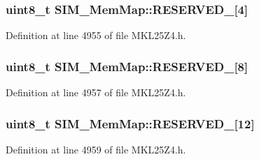 \subsubsection[{\texorpdfstring{R\+E\+S\+E\+R\+V\+E\+D\+\_\+2}{RESERVED_2}}]{\setlength{\rightskip}{0pt plus 5cm}uint8\+\_\+t S\+I\+M\+\_\+\+Mem\+Map\+::\+R\+E\+S\+E\+R\+V\+E\+D\+\_\mbox{[}4\mbox{]}}\hypertarget{struct_s_i_m___mem_map_a291f9d8d1d4e3f8a94668f14592402b0}{}\label{struct_s_i_m___mem_map_a291f9d8d1d4e3f8a94668f14592402b0}


Definition at line 4955 of file M\+K\+L25\+Z4.\+h.

\subsubsection[{\texorpdfstring{R\+E\+S\+E\+R\+V\+E\+D\+\_\+3}{RESERVED_3}}]{\setlength{\rightskip}{0pt plus 5cm}uint8\+\_\+t S\+I\+M\+\_\+\+Mem\+Map\+::\+R\+E\+S\+E\+R\+V\+E\+D\+\_\mbox{[}8\mbox{]}}\hypertarget{struct_s_i_m___mem_map_a581c4826706d6c336d1847b83d3dd89a}{}\label{struct_s_i_m___mem_map_a581c4826706d6c336d1847b83d3dd89a}


Definition at line 4957 of file M\+K\+L25\+Z4.\+h.

\subsubsection[{\texorpdfstring{R\+E\+S\+E\+R\+V\+E\+D\+\_\+4}{RESERVED_4}}]{\setlength{\rightskip}{0pt plus 5cm}uint8\+\_\+t S\+I\+M\+\_\+\+Mem\+Map\+::\+R\+E\+S\+E\+R\+V\+E\+D\+\_\mbox{[}12\mbox{]}}\hypertarget{struct_s_i_m___mem_map_a5a6fab98427eb3ae20ebd13a740d55ad}{}\label{struct_s_i_m___mem_map_a5a6fab98427eb3ae20ebd13a740d55ad}


Definition at line 4959 of file M\+K\+L25\+Z4.\+h.

